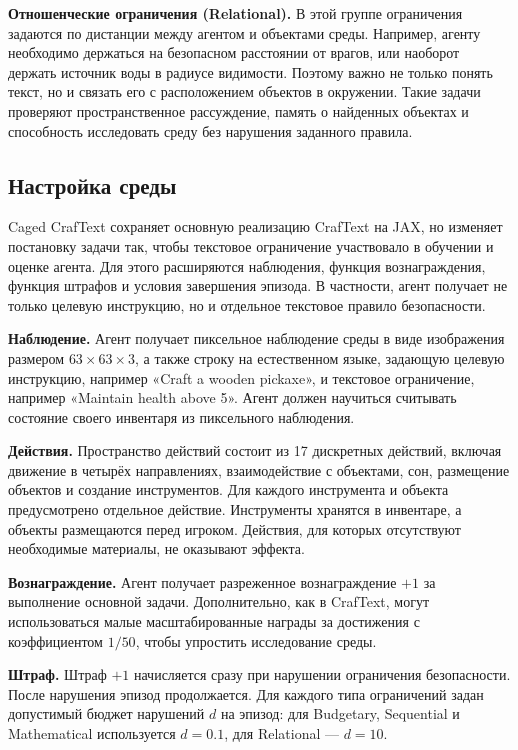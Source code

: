 \textbf{Отношенческие ограничения (Relational).} В этой группе ограничения задаются по дистанции между агентом и объектами среды. Например, агенту необходимо держаться на безопасном расстоянии от врагов, или наоборот держать источник воды в радиусе видимости. Поэтому важно не только понять текст, но и связать его с расположением объектов в окружении. Такие задачи проверяют пространственное рассуждение, память о найденных объектах и способность исследовать среду без нарушения заданного правила.

\subsection{Настройка среды}
\label{subsec:caged_env_setup}

Caged CrafText сохраняет основную реализацию CrafText на JAX, но изменяет постановку задачи так, чтобы текстовое ограничение участвовало в обучении и оценке агента. Для этого расширяются наблюдения, функция вознаграждения, функция штрафов и условия завершения эпизода. В частности, агент получает не только целевую инструкцию, но и отдельное текстовое правило безопасности.

\textbf{Наблюдение.} Агент получает пиксельное наблюдение среды в виде изображения размером $63 \times 63 \times 3$, а также строку на естественном языке, задающую целевую инструкцию, например «Craft a wooden pickaxe», и текстовое ограничение, например «Maintain health above 5». Агент должен научиться считывать состояние своего инвентаря из пиксельного наблюдения.

\textbf{Действия.} Пространство действий состоит из 17 дискретных действий, включая движение в четырёх направлениях, взаимодействие с объектами, сон, размещение объектов и создание инструментов. Для каждого инструмента и объекта предусмотрено отдельное действие. Инструменты хранятся в инвентаре, а объекты размещаются перед игроком. Действия, для которых отсутствуют необходимые материалы, не оказывают эффекта.

\textbf{Вознаграждение.} Агент получает разреженное вознаграждение $+1$ за выполнение основной задачи. Дополнительно, как в CrafText, могут использоваться малые масштабированные награды за достижения с коэффициентом $1/50$, чтобы упростить исследование среды.

\textbf{Штраф.} Штраф $+1$ начисляется сразу при нарушении ограничения безопасности. После нарушения эпизод продолжается. Для каждого типа ограничений задан допустимый бюджет нарушений $d$ на эпизод: для Budgetary, Sequential и Mathematical используется $d = 0.1$, для Relational --- $d = 10$.

